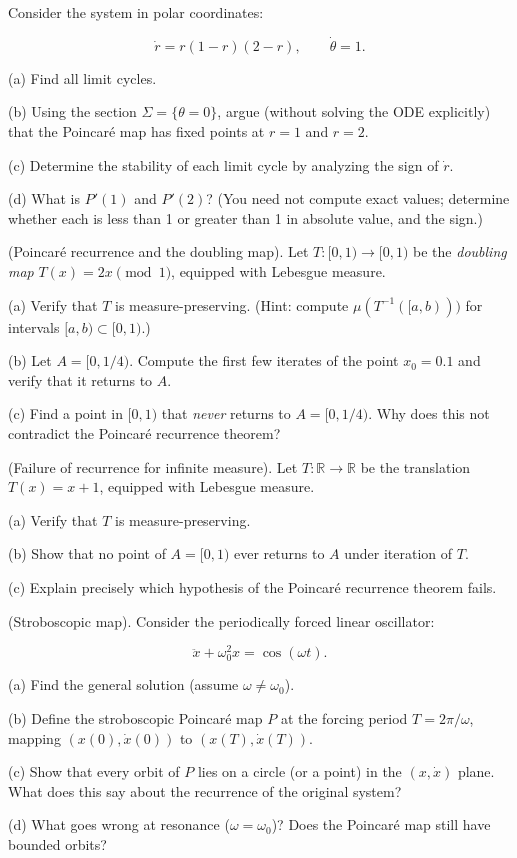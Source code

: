 \begin{exercise}
Consider the system in polar coordinates:

\[
\dot{r} = r(1 - r)(2 - r), \qquad \dot{\theta} = 1.
\]

(a) Find all limit cycles.

(b) Using the section $\Sigma = \{\theta = 0\}$, argue (without solving the ODE explicitly) that the Poincaré map has fixed points at $r = 1$ and $r = 2$.

(c) Determine the stability of each limit cycle by analyzing the sign of $\dot{r}$.

(d) What is $P'(1)$ and $P'(2)$? (You need not compute exact values; determine whether each is less than 1 or greater than 1 in absolute value, and the sign.)
\end{exercise}


\begin{exercise}
(Poincaré recurrence and the doubling map). Let $T: [0,1) \to [0,1)$ be the \textit{doubling map} $T(x) = 2x \pmod{1}$, equipped with Lebesgue measure.

(a) Verify that $T$ is measure-preserving. (Hint: compute $\mu(T^{-1}([a, b)))$ for intervals $[a, b) \subset [0, 1)$.)

(b) Let $A = [0, 1/4)$. Compute the first few iterates of the point $x_0 = 0.1$ and verify that it returns to $A$.

(c) Find a point in $[0,1)$ that \textit{never} returns to $A = [0, 1/4)$. Why does this not contradict the Poincaré recurrence theorem?
\end{exercise}


\begin{exercise}
(Failure of recurrence for infinite measure). Let $T: \mathbb{R} \to \mathbb{R}$ be the translation $T(x) = x + 1$, equipped with Lebesgue measure.

(a) Verify that $T$ is measure-preserving.

(b) Show that no point of $A = [0, 1)$ ever returns to $A$ under iteration of $T$.

(c) Explain precisely which hypothesis of the Poincaré recurrence theorem fails.
\end{exercise}


\begin{exercise}
(Stroboscopic map). Consider the periodically forced linear oscillator:

\[
\ddot{x} + \omega_0^2 x = \cos(\omega t).
\]

(a) Find the general solution (assume $\omega \neq \omega_0$).

(b) Define the stroboscopic Poincaré map $P$ at the forcing period $T = 2\pi/\omega$, mapping $(x(0), \dot{x}(0))$ to $(x(T), \dot{x}(T))$.

(c) Show that every orbit of $P$ lies on a circle (or a point) in the $(x, \dot{x})$ plane. What does this say about the recurrence of the original system?

(d) What goes wrong at resonance ($\omega = \omega_0$)? Does the Poincaré map still have bounded orbits?
\end{exercise}


